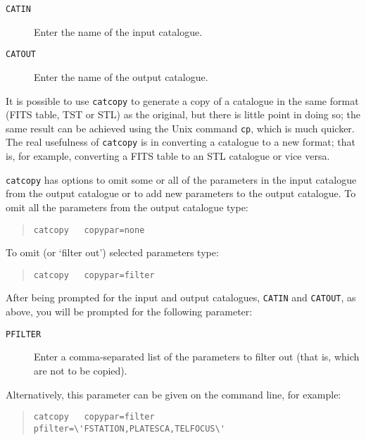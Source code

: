 \documentclass[twoside,11pt]{article}
\renewcommand{\_}{\texttt{\symbol{95}}}
\begin{document}
\begin{description}

  \item[ {\tt CATIN} ] Enter the name of the input catalogue.

  \item[ {\tt CATOUT} ] Enter the name of the output catalogue.

\end{description}

It is possible to use {\tt catcopy} to generate a copy of a catalogue in
the same format (FITS table, TST or STL) as the original, but there
is little point in doing so; the same result can be achieved using the
Unix command {\tt cp}, which is much quicker. The real usefulness of
{\tt catcopy} is in converting a catalogue to a new format; that is,
for example, converting a FITS table to an STL catalogue or vice versa.

{\tt catcopy} has options to omit some or all of the parameters in the
input catalogue from the output catalogue or to add new parameters to the
output catalogue.  To omit all the parameters from the output catalogue
type:

\begin{verse}
{\tt catcopy ~ copypar=none}
\end{verse}

To omit (or `filter out') selected parameters type:

\begin{verse}
{\tt catcopy ~ copypar=filter}
\end{verse}

After being prompted for the input and output catalogues, {\tt CATIN} and
{\tt CATOUT}, as above, you will be prompted for the following parameter:

\begin{description}

  \item[ {\tt PFILTER} ] Enter a comma-separated list of the parameters to
   filter out (that is, which are not to be copied).

\end{description}

Alternatively, this parameter can be given on the command line, for
example:

\begin{verse}
{\tt catcopy ~ copypar=filter ~ pfilter=\verb-\'FSTATION,PLATESCA,TELFOCUS\'-}
\end{verse}
\end{document}
